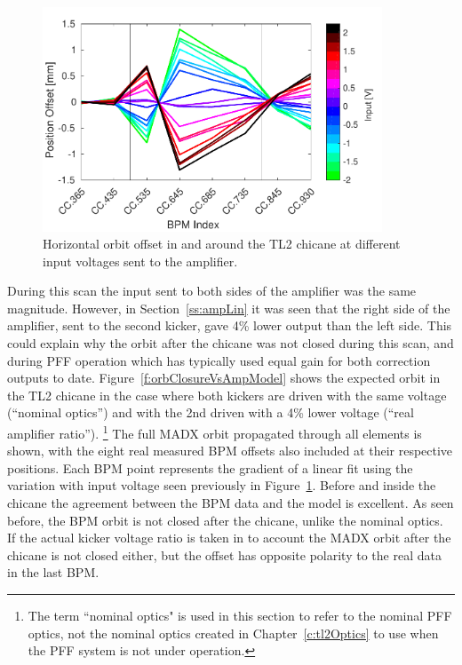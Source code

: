 \begin{figure}
  \centering
  \includegraphics[width=0.9\textwidth]{Figures/commissioning/HOrbitVsInput}
  \caption{Horizontal orbit offset in and around the TL2 chicane at different input voltages sent to the amplifier.}
  \label{f:HOrbitVsInput}
\end{figure}

During this scan the input sent to both sides of the amplifier was the same magnitude. However, in Section~\ref{ss:ampLin} it was seen that the right side of the amplifier, sent to the second kicker, gave 4\% lower output than the left side. This could explain why the orbit after the chicane was not closed during this scan, and during PFF operation which has typically used equal gain for both correction outputs to date. Figure~\ref{f:orbClosureVsAmpModel} shows the expected orbit in the TL2 chicane in the case where both kickers are driven with the same voltage (``nominal optics'') and with the 2nd driven with a 4\% lower voltage (``real amplifier ratio'').
\footnote{The term ``nominal optics" is used in this section to refer to the nominal PFF optics, not the nominal optics created in Chapter~\ref{c:tl2Optics} to use when the PFF system is not under operation.}
The full MADX orbit propagated through all elements is shown, with the eight real measured BPM offsets also included at their respective positions. Each BPM point represents the gradient of a linear fit using the variation with input voltage seen previously in Figure~\ref{f:HOrbitVsInput}. Before and inside the chicane the agreement between the BPM data and the model is excellent. As seen before, the BPM orbit is not closed after the chicane, unlike the nominal optics. If the actual kicker voltage ratio is taken in to account the MADX orbit after the chicane is not closed either, but the offset has opposite polarity to the real data in the last BPM.

